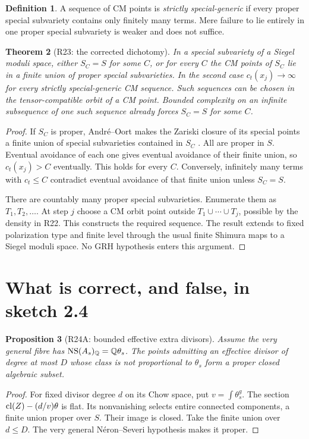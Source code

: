 \documentclass[11pt,a4paper]{article}
\newtheorem{theorem}{Theorem}[section]
\newtheorem{proposition}[theorem]{Proposition}
\theoremstyle{definition}\newtheorem{definition}[theorem]{Definition}
\theoremstyle{remark}\newtheorem{remark}[theorem]{Remark}
\newcommand{\Q}{\mathbb Q}\newcommand{\Z}{\mathbb Z}\newcommand{\C}{\mathbb C}\newcommand{\R}{\mathbb R}
\begin{document}
\begin{definition}
A sequence of CM points is \emph{strictly special-generic} if every proper special subvariety contains only finitely many terms. Mere failure to lie entirely in one proper special subvariety is weaker and does not suffice.
\end{definition}

\begin{theorem}[R23: the corrected dichotomy]\label{R23}
In a special subvariety of a Siegel moduli space, either $S_C=S$ for some $C$, or for every $C$ the CM points of $S_C$ lie in a finite union of proper special subvarieties. In the second case $c_t(x_j)\to\infty$ for every strictly special-generic CM sequence. Such sequences can be chosen in the tensor-compatible orbit of a CM point. Bounded complexity on an infinite subsequence of one such sequence already forces $S_C=S$ for some $C$.
\end{theorem}
\begin{proof}
If $S_C$ is proper, Andr\'e--Oort makes the Zariski closure of its special points a finite union of special subvarieties contained in $S_C$ \citep[Theorem~1.3, p.~380; formulation in Conjecture~1.1, p.~379]{Tsimerman18}. All are proper in $S$. Eventual avoidance of each one gives eventual avoidance of their finite union, so $c_t(x_j)>C$ eventually. This holds for every $C$. Conversely, infinitely many terms with $c_t\le C$ contradict eventual avoidance of that finite union unless $S_C=S$.

There are countably many proper special subvarieties. Enumerate them as $T_1,T_2,\ldots$. At step $j$ choose a CM orbit point outside $T_1\cup\cdots\cup T_j$, possible by the density in R22. This constructs the required sequence. The result extends to fixed polarization type and finite level through the usual finite Shimura maps to a Siegel moduli space. No GRH hypothesis enters this argument.
\end{proof}

\section{What is correct, and false, in sketch 2.4}
\begin{proposition}[R24A: bounded effective extra divisors]\label{R24A}
Assume the very general fibre has $\NS(A_s)_\Q=\Q\theta_s$. The points admitting an effective divisor of degree at most $D$ whose class is not proportional to $\theta_s$ form a proper closed algebraic subset.
\end{proposition}
\begin{proof}
For fixed divisor degree $d$ on its Chow space, put $v=\int\theta_s^g$. The section $\operatorname{cl}(Z)-(d/v)\theta$ is flat. Its nonvanishing selects entire connected components, a finite union proper over $S$. Their image is closed. Take the finite union over $d\le D$. The very general N\'eron--Severi hypothesis makes it proper.
\end{proof}
\end{document}

